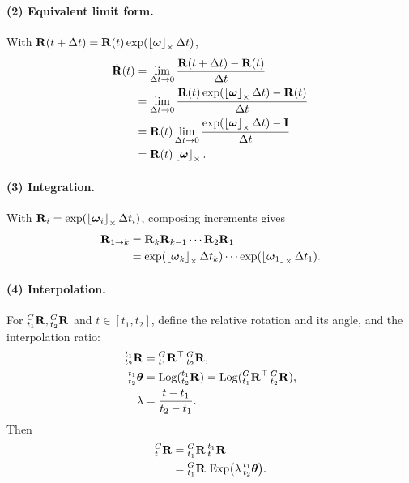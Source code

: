 \paragraph{(2) Equivalent limit form.} With $\vect{R}(t+\Delta t) = \vect{R}(t)\exp(\skewsym{\vect{\omega}}\Delta t)$,
\begin{align}
\dot{\vect{R}}(t) &= \lim_{\Delta t\to0}\frac{\vect{R}(t+\Delta t) - \vect{R}(t)}{\Delta t} \\
&= \lim_{\Delta t\to0}\frac{\vect{R}(t)\exp(\skewsym{\vect{\omega}}\Delta t) - \vect{R}(t)}{\Delta t} \\
&= \vect{R}(t)\lim_{\Delta t\to0}\frac{\exp(\skewsym{\vect{\omega}}\Delta t) - \vect{I}}{\Delta t} \\
&= \vect{R}(t)\skewsym{\vect{\omega}}.
\end{align}

\paragraph{(3) Integration.} With $\vect{R}_i = \exp(\skewsym{\vect{\omega}_i}\Delta t_i)$, composing increments gives
\begin{align}
\vect{R}_{1\to k} &= \vect{R}_k\vect{R}_{k-1}\cdots\vect{R}_2\vect{R}_1 \\
&= \exp(\skewsym{\vect{\omega}_k}\Delta t_k)\cdots\exp(\skewsym{\vect{\omega}_1}\Delta t_1).
\end{align}

\paragraph{(4) Interpolation.} For ${}^{G}_{t_1}\vect{R},{}^{G}_{t_2}\vect{R}$ and $t\in[t_1,t_2]$, define the relative rotation and its angle, and the interpolation ratio:
\begin{align}
{}^{t_1}_{t_2}\vect{R} &= {}^{G}_{t_1}\vect{R}\trans\,{}^{G}_{t_2}\vect{R}, \\
{}^{t_1}_{t_2}\vect{\theta} &= \Log({}^{t_1}_{t_2}\vect{R}) = \Log({}^{G}_{t_1}\vect{R}\trans\,{}^{G}_{t_2}\vect{R}), \\
\lambda &= \frac{t-t_1}{t_2-t_1}.
\end{align}
Then
\begin{align}
{}^{G}_{t}\vect{R} &= {}^{G}_{t_1}\vect{R}\,{}^{t_1}_{t}\vect{R} \\
&= {}^{G}_{t_1}\vect{R}\,\Exp\!\big(\lambda\,{}^{t_1}_{t_2}\vect{\theta}\big).
\end{align}

